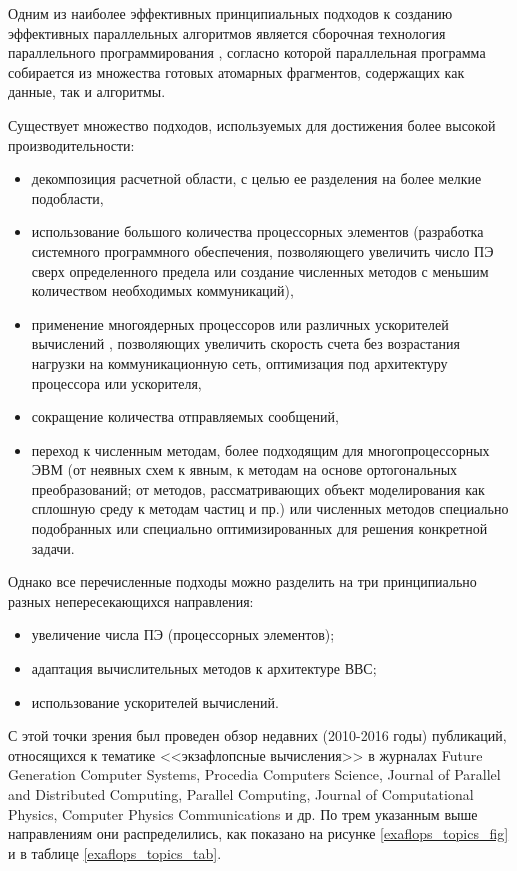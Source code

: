 Одним из наиболее эффективных принципиальных подходов к созданию эффективных параллельных алгоритмов является сборочная технология параллельного программирования \cite{MalyshkinSynthesis,MalyshkinASSY,Kraeva2001,
	MalyshkinTsigulin}, согласно которой параллельная программа собирается из множества   готовых атомарных фрагментов, содержащих как данные, так и алгоритмы.

Существует множество подходов, используемых для достижения более высокой производительности: 
\begin{itemize}
	\item декомпозиция расчетной области\cite{Liewer1989,Kraeva2001,Stijnman2003, Eastwood1995}, с целью ее разделения на более мелкие подобласти, 
	\item использование большого количества процессорных элементов (разработка системного программного обеспечения, позволяющего увеличить число ПЭ сверх определенного предела
	\cite{Gropp2009} или создание численных методов с меньшим количеством необходимых коммуникаций),
	\item применение многоядерных процессоров или различных ускорителей вычислений \cite{SteYuz13}, позволяющих увеличить скорость счета без возрастания нагрузки на коммуникационную сеть, оптимизация под архитектуру процессора или ускорителя, 
	\item сокращение количества отправляемых сообщений, 
	\item переход к численным методам, более подходящим для многопроцессорных ЭВМ (от неявных схем к явным, к методам на основе ортогональных преобразований; от методов, рассматривающих объект моделирования как сплошную среду к методам частиц и пр.) или численных методов специально подобранных или специально оптимизированных для решения конкретной задачи. 
\end{itemize}

Однако все перечисленные подходы можно разделить на три принципиально разных непересекающихся направления:
\begin{itemize}
	\item увеличение числа ПЭ (процессорных элементов);
	\item адаптация вычислительных методов к архитектуре ВВС;
	\item использование ускорителей вычислений.
\end{itemize}

С этой точки зрения был проведен обзор недавних (2010-2016 годы) публикаций, относящихся к тематике <<экзафлопсные вычисления>> в журналах Future Generation Computer Systems, Procedia Computers Science, Journal of Parallel and Distributed Computing, Parallel Computing, Journal of Computational Physics, Computer Physics Communications и др.
По трем указанным выше направлениям они распределились, как показано на рисунке \ref{exaflops_topics_fig} и в таблице \ref{exaflops_topics_tab}.


